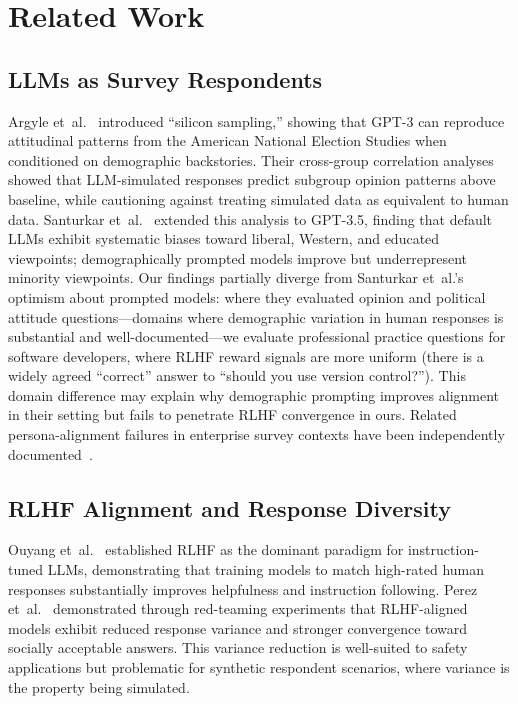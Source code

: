 \documentclass[sigconf,nonacm]{acmart}
\begin{document}
\section{Related Work}
\label{sec:related}

\subsection{LLMs as Survey Respondents}
\label{sec:rw:survey}

Argyle et~al.~\cite{argyle2023} introduced ``silicon sampling,'' showing
that GPT-3 can reproduce attitudinal patterns from the American National
Election Studies when conditioned on demographic backstories.
Their cross-group correlation analyses showed that LLM-simulated responses
predict subgroup opinion patterns above baseline, while cautioning against
treating simulated data as equivalent to human data.
Santurkar et~al.~\cite{santurkar2023} extended this analysis to GPT-3.5,
finding that default LLMs exhibit systematic biases toward liberal, Western,
and educated viewpoints; demographically prompted models improve but
underrepresent minority viewpoints.
Our findings partially diverge from Santurkar et~al.'s optimism about
prompted models: where they evaluated opinion and political attitude
questions---domains where demographic variation in human responses is
substantial and well-documented---we evaluate professional practice questions
for software developers, where RLHF reward signals are more uniform (there
is a widely agreed ``correct'' answer to ``should you use version control?'').
This domain difference may explain why demographic prompting improves
alignment in their setting but fails to penetrate RLHF convergence in ours.
Related persona-alignment failures in enterprise survey contexts have been
independently documented~\cite{ssrn6829506}.

\subsection{RLHF Alignment and Response Diversity}
\label{sec:rw:rlhf}

Ouyang et~al.~\cite{ouyang2022} established RLHF as the dominant paradigm
for instruction-tuned LLMs, demonstrating that training models to match
high-rated human responses substantially improves helpfulness and instruction
following.
Perez et~al.~\cite{perez2022} demonstrated through red-teaming experiments
that RLHF-aligned models exhibit reduced response variance and stronger
convergence toward socially acceptable answers.
This variance reduction is well-suited to safety applications but
problematic for synthetic respondent scenarios, where variance is the
property being simulated.
\end{document}
